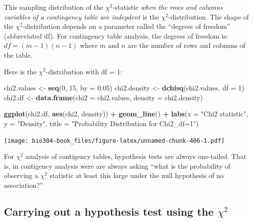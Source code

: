 \documentclass[]{book}
\newenvironment{Shaded}{\begin{snugshade}}{\end{snugshade}}
\newcommand{\DataTypeTok}[1]{\textcolor[rgb]{0.13,0.29,0.53}{#1}}
\newcommand{\DecValTok}[1]{\textcolor[rgb]{0.00,0.00,0.81}{#1}}
\newcommand{\FloatTok}[1]{\textcolor[rgb]{0.00,0.00,0.81}{#1}}
\newcommand{\KeywordTok}[1]{\textcolor[rgb]{0.13,0.29,0.53}{\textbf{#1}}}
\newcommand{\NormalTok}[1]{#1}
\newcommand{\OperatorTok}[1]{\textcolor[rgb]{0.81,0.36,0.00}{\textbf{#1}}}
\newcommand{\StringTok}[1]{\textcolor[rgb]{0.31,0.60,0.02}{#1}}
\theoremstyle{definition}
\theoremstyle{definition}
\theoremstyle{definition}
\theoremstyle{remark}
\begin{document}
This sampling distribution of the \(\chi^2\)-statistic \emph{when the
rows and columns variables of a contingency table are indepdent} is the
\(\chi^2\)-distribution. The shape of the \(\chi^2\)-distribution
depends on a parameter called the ``degrees of freedom'' (abbreviated
df). For contingency table analysis, the degrees of freedom is:
\(df = (m - 1)(n - 1)\) where \(m\) and \(n\) are the number of rows and
columns of the table.

Here is the \(\chi^2\)-distribution with df = 1:

\begin{Shaded}
\begin{Highlighting}[]
\NormalTok{chi2.values <-}\StringTok{ }\KeywordTok{seq}\NormalTok{(}\DecValTok{0}\NormalTok{, }\DecValTok{15}\NormalTok{, }\DataTypeTok{by =} \FloatTok{0.05}\NormalTok{)}
\NormalTok{chi2.density <-}\StringTok{ }\KeywordTok{dchisq}\NormalTok{(chi2.values, }\DataTypeTok{df =} \DecValTok{1}\NormalTok{)}
\NormalTok{chi2.df <-}\StringTok{ }\KeywordTok{data.frame}\NormalTok{(}\DataTypeTok{chi2 =}\NormalTok{ chi2.values, }\DataTypeTok{density =}\NormalTok{ chi2.density)}

\KeywordTok{ggplot}\NormalTok{(chi2.df, }\KeywordTok{aes}\NormalTok{(chi2, density)) }\OperatorTok{+}\StringTok{ }
\StringTok{  }\KeywordTok{geom_line}\NormalTok{() }\OperatorTok{+}\StringTok{ }
\StringTok{  }\KeywordTok{labs}\NormalTok{(}\DataTypeTok{x =} \StringTok{"Chi2 statistic"}\NormalTok{, }\DataTypeTok{y =} \StringTok{"Density"}\NormalTok{,}
       \DataTypeTok{title =} \StringTok{"Probability Distribution for Chi2_df=1"}\NormalTok{)}
\end{Highlighting}
\end{Shaded}

\texttt{[image: bio304-book\_files/figure-latex/unnamed-chunk-406-1.pdf]}

For \(\chi^2\) analysis of contigency tables, hypothesis tests are
always one-tailed. That is, in contigency analysis were are always
asking ``what is the probability of observing a \(\chi^2\) statistic at
least this large under the null hypothesis of no association?''

\hypertarget{carrying-out-a-hypothesis-test-using-the-chi2}{%
\subsection{\texorpdfstring{Carrying out a hypothesis test using the
\(\chi^2\)}{Carrying out a hypothesis test using the \textbackslash{}chi\^{}2}}\label{carrying-out-a-hypothesis-test-using-the-chi2}}
\end{document}
